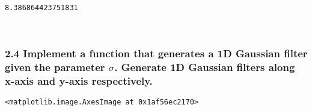 \documentclass[11pt]{article}
\begin{document}
    \begin{Verbatim}[commandchars=\\\{\}]
8.386864423751831
    \end{Verbatim}

    \begin{center}
    \end{center}
    { \hspace*{\fill} \\}
    
    \hypertarget{implement-a-function-that-generates-a-1d-gaussian-filter-given-the-parameter-sigma.-generate-1d-gaussian-filters-along-x-axis-and-y-axis-respectively.}{%
\subsubsection{\texorpdfstring{2.4 Implement a function that generates a
1D Gaussian filter given the parameter \(\sigma\). Generate 1D Gaussian
filters along x-axis and y-axis
respectively.}{2.4 Implement a function that generates a 1D Gaussian filter given the parameter \textbackslash sigma. Generate 1D Gaussian filters along x-axis and y-axis respectively.}}\label{implement-a-function-that-generates-a-1d-gaussian-filter-given-the-parameter-sigma.-generate-1d-gaussian-filters-along-x-axis-and-y-axis-respectively.}}

            \begin{tcolorbox}[breakable, size=fbox, boxrule=.5pt, pad at break*=1mm, opacityfill=0]
\begin{Verbatim}[commandchars=\\\{\}]
<matplotlib.image.AxesImage at 0x1af56ec2170>
\end{Verbatim}
\end{tcolorbox}
        
    \begin{center}
    \end{center}
    { \hspace*{\fill} \\}
    
\end{document}
